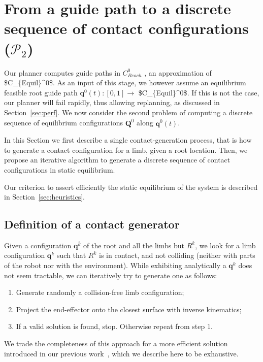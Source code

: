 \section{From a guide path to a discrete sequence of contact configurations ($\mathcal{P}_2$)}
\label{sec:contact}
Our planner computes guide paths in $C_{Reach}^0$ , an approximation of \gls{$C_{Equil}^0$}.
As an input of this stage, we however assume an \gls{equilibrium feasible} root guide path $\mathbf{q}^0(t) : [0,1] \longrightarrow$ \gls{$C_{Equil}^0$}.
If this is not the case, our planner will fail rapidly, thus allowing replanning, as discussed in Section~\ref{sec:perf}.
We now consider the second problem of computing a discrete sequence of equilibrium configurations $\mathbf{Q}^{\overline{0}}$ along $\mathbf{q}^0(t)$.

In this Section we first describe a single contact-generation process, that is how to generate a contact configuration for a limb, given a
root location.
Then, we propose an iterative algorithm to generate a discrete sequence of contact configurations in static equilibrium.

Our criterion to assert efficiently the static equilibrium of the system
is described in Section~\ref{sec:heuristics}.

\subsection{Definition of a contact generator}
\label{sec:single_contact}
Given a configuration $\mathbf{q}^{\overline{k}}$ of the root and all the limbs but $R^k$, we look for a limb configuration $\mathbf{q}^k$ such that
$R^k$ is in contact, and not colliding (neither with parts of the robot nor with the environment).
While exhibiting analytically a $\mathbf{q}^{k}$ does not seem tractable, we can iteratively try to generate one as follows:
\begin{enumerate}
\item Generate randomly a collision-free limb configuration;
\item Project the end-effector onto the closest surface with inverse kinematics;
\item If a valid solution is found, stop. Otherwise repeat from step 1.
\end{enumerate}


We trade the completeness of this approach for a more efficient solution introduced in our previous work~\citep{Tonneau2014}, which we describe
here to be exhaustive.


